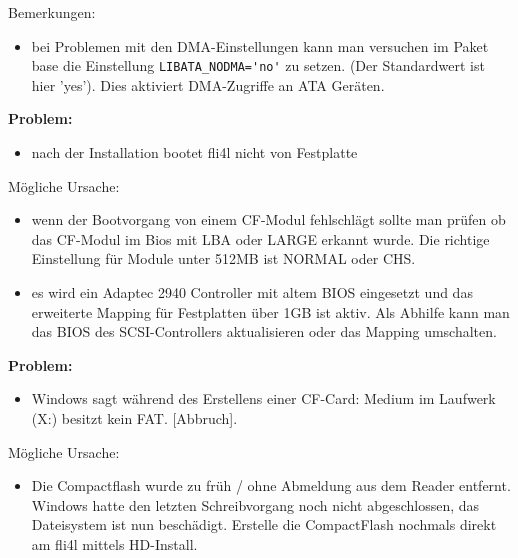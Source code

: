     Bemerkungen:
    \begin{itemize}
    \item bei Problemen mit den DMA-Einstellungen kann man versuchen im Paket 
      base die Einstellung \verb*?LIBATA_NODMA='no'? zu setzen. (Der Standardwert
      ist hier 'yes'). Dies aktiviert DMA-Zugriffe an ATA Geräten.
    \end{itemize}

    \textbf{Problem:}
    \begin{itemize}
    \item nach der Installation bootet fli4l nicht von Festplatte
    \end{itemize}
    
    Mögliche Ursache:
    \begin{itemize}
    \item wenn der Bootvorgang von einem CF-Modul fehlschlägt sollte man prüfen
    ob das CF-Modul im Bios mit LBA oder LARGE erkannt wurde. Die richtige 
    Einstellung für Module unter 512MB ist NORMAL oder CHS.
    \item es wird ein Adaptec 2940 Controller mit altem BIOS eingesetzt und das 
    erweiterte Mapping für Festplatten über 1GB ist aktiv. Als Abhilfe kann man 
    das BIOS des SCSI-Controllers aktualisieren oder das Mapping umschalten.
    \end{itemize}

    \textbf{Problem:}
    \begin{itemize}
    \item Windows sagt während des Erstellens einer CF-Card: \glqq{}Medium im Laufwerk
      (X:) besitzt kein FAT. [Abbruch]\grqq{}.
    \end{itemize}

    Mögliche Ursache:
    \begin{itemize}
    \item Die Compactflash wurde zu früh / ohne Abmeldung aus dem Reader entfernt.
    Windows hatte den letzten Schreibvorgang noch nicht abgeschlossen, das
    Dateisystem ist nun beschädigt. Erstelle die CompactFlash nochmals
    direkt am fli4l mittels HD-Install.
    \end{itemize}
